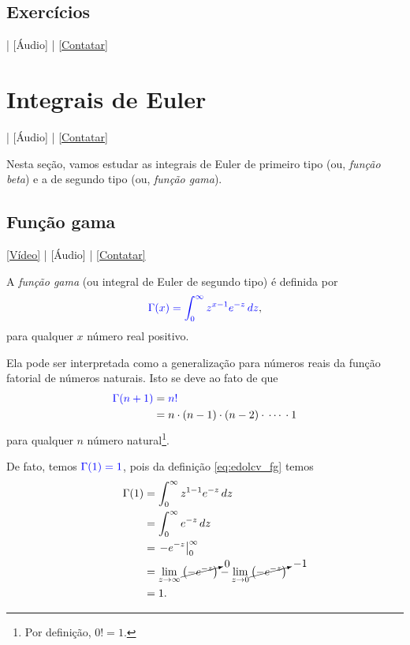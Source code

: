 \subsection*{Exercícios}

\begin{flushright}
  [Vídeo] | [Áudio] | \href{https://phkonzen.github.io/notas/contato.html}{[Contatar]}
\end{flushright}

\emconstrucao

\section{Integrais de Euler}\label{cap_edolcv_sec_ieuler}

\begin{flushright}
  [Vídeo] | [Áudio] | \href{https://phkonzen.github.io/notas/contato.html}{[Contatar]}
\end{flushright}

Nesta seção, vamos estudar as integrais de Euler de primeiro tipo (ou, \emph{função beta}) e a de segundo tipo (ou, \emph{função gama}).

\subsection{Função gama}

\begin{flushright}
  \href{https://archive.org/details/funcao-gama}{[Vídeo]} | [Áudio] | \href{https://phkonzen.github.io/notas/contato.html}{[Contatar]}
\end{flushright}

A \emph{função gama} (ou integral de Euler de segundo tipo) é definida por
\begin{equation}\label{eq:edolcv_fg}
  {\color{blue}\Gamma(x) = \int_0^\infty z^{x-1}e^{-z}\,dz},
\end{equation}
para qualquer $x$ número real positivo.

Ela pode ser interpretada como a generalização para números reais da função fatorial de números naturais. Isto se deve ao fato de que
\begin{align}
  {\color{blue}\Gamma(n+1)} &= {\color{blue}n!}\\
  &= n\cdot (n-1)\cdot (n-2)\cdot\, \cdots\, \cdot 1
\end{align}
para qualquer $n$ número natural\footnote{Por definição, $0!=1$.}.

De fato, temos ${\color{blue}\Gamma(1) = 1}$, pois da definição \eqref{eq:edolcv_fg} temos
\begin{align}
  \Gamma(1) &= \int_0^\infty z^{1-1}e^{-z}\,dz\\
  &= \int_0^\infty e^{-z}\,dz\\
  &= \left.-e^{-z}\right|_{0}^{\infty}\\
  &= \lim_{z\to\infty} \cancelto{0}{\left(-e^{-z}\right)} - \lim_{z\to 0} \cancelto{-1}{\left(-e^{-z}\right)}\\
  &= 1.
\end{align}

